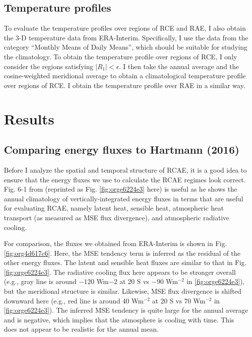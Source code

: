 \documentclass[11pt]{article}
\begin{document}
\subsection{Temperature profiles}
\label{sec:orgd9077a7}
To evaluate the temperature profiles over regions of RCE and RAE, I also obtain the 3-D temperature data from ERA-Interim. Specifically, I use the data from the category ``Monthly Means of Daily Means'', which should be suitable for studying the climatology. To obtain the temperature profile over regions of RCE, I only consider the regions satisfying \(|R_1| < \epsilon\). I then take the annual average and the cosine-weighted meridional average to obtain a climatological temperature profile over regions of RCE. I obtain the temperature profile over RAE in a similar way.

\section{Results}
\label{sec:org2afc12d}
\subsection{Comparing energy fluxes to Hartmann (2016)}
\label{sec:org34c0928}
Before I analyze the spatial and temporal structure of RCAE, it is a good idea to ensure that the energy fluxes we use to calculate the RCAE regimes look correct. Fig. 6-1 from \cite{hartmann_global_2016} (reprinted as Fig. \ref{fig:orge6224e3} here) is useful as he shows the annual climatology of vertically-integrated energy fluxes in terms that are useful for evaluating RCAE, namely latent heat, sensible heat, atmospheric heat transport (as measured as MSE flux divergence), and atmospheric radiative cooling.

For comparison, the fluxes we obtained from ERA-Interim is shown in Fig. \ref{fig:org4d617c6}. Here, the MSE tendency term is inferred as the residual of the other energy fluxes. The latent and sensible heat fluxes are similar to that in Fig. \ref{fig:orge6224e3}. The radiative cooling flux here appears to be stronger overall (e.g., gray line is around \(-120\) Wm\({-2}\) at 20 S vs \(-90\) Wm\(^{-2}\) in \ref{fig:orge6224e3}), but the meridional structure is similar. Likewise, MSE flux divergence is shifted downward here (e.g., red line is around 40 Wm\(^{-2}\) at 20 S vs 70 Wm\(^{-2}\) in \ref{fig:orge6224e3}). The inferred MSE tendency is quite large for the annual average and is negative, which implies that the atmosphere is cooling with time. This does not appear to be realistic for the annual mean.
\end{document}
